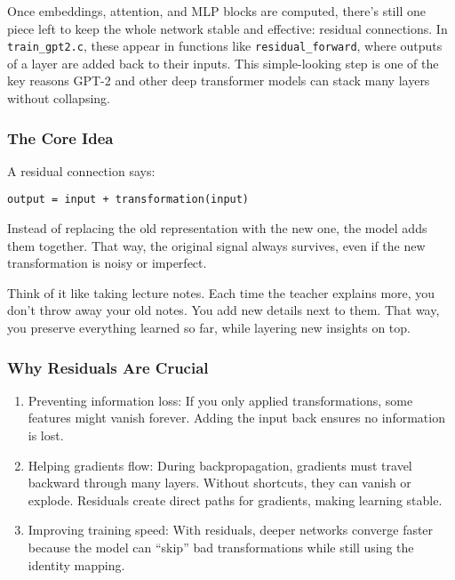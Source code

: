 \documentclass[
  letterpaper,
  DIV=11,
  numbers=noendperiod]{scrreprt}
\begin{document}
Once embeddings, attention, and MLP blocks are computed, there's still
one piece left to keep the whole network stable and effective: residual
connections. In \texttt{train\_gpt2.c}, these appear in functions like
\texttt{residual\_forward}, where outputs of a layer are added back to
their inputs. This simple-looking step is one of the key reasons GPT-2
and other deep transformer models can stack many layers without
collapsing.

\subsubsection{The Core Idea}\label{the-core-idea-1}

A residual connection says:

\begin{verbatim}
output = input + transformation(input)
\end{verbatim}

Instead of replacing the old representation with the new one, the model
adds them together. That way, the original signal always survives, even
if the new transformation is noisy or imperfect.

Think of it like taking lecture notes. Each time the teacher explains
more, you don't throw away your old notes. You add new details next to
them. That way, you preserve everything learned so far, while layering
new insights on top.

\subsubsection{Why Residuals Are
Crucial}\label{why-residuals-are-crucial}

\begin{enumerate}
\def\labelenumi{\arabic{enumi}.}
\item
  Preventing information loss: If you only applied transformations, some
  features might vanish forever. Adding the input back ensures no
  information is lost.
\item
  Helping gradients flow: During backpropagation, gradients must travel
  backward through many layers. Without shortcuts, they can vanish or
  explode. Residuals create direct paths for gradients, making learning
  stable.
\item
  Improving training speed: With residuals, deeper networks converge
  faster because the model can ``skip'' bad transformations while still
  using the identity mapping.
\end{enumerate}
\end{document}
